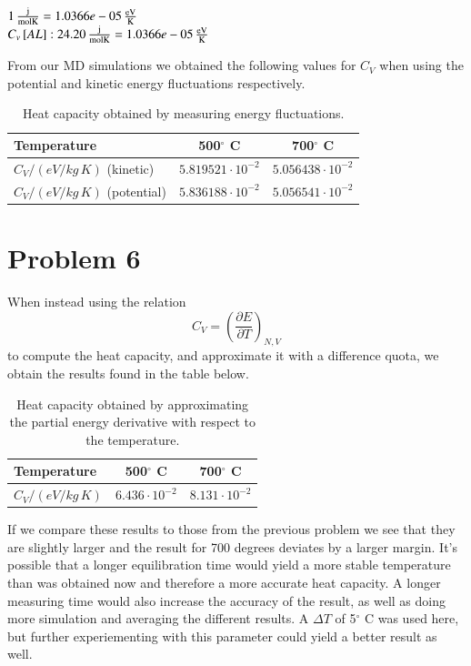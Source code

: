 $\unit[1]{\frac{j}{mol K}}=\unit[1.0366e-05]{\frac{eV}{K}}$ \\
$C_v\left[AL\right]:\unit[24.20]{\frac{j}{mol K}}=\unit[1.0366e-05]{\frac{eV}{K}}$

\noindent From our MD simulations we obtained the following values for $C_V$ when using the potential and kinetic energy fluctuations respectively.
\begin{table}[h!]
	\centering
	\caption{Heat capacity obtained by measuring energy fluctuations.}
	\begin{tabular}{l|cc}
		\hline \textbf{Temperature} & \textbf{500$^\circ$ C} & \textbf{700$^\circ$ C} \\ \hline
		$C_V / (\unit{eV/kg\,K})$ (kinetic) & $5.819521 \cdot 10^{-2}$ & $5.056438 \cdot 10^{-2}$ \\
		$C_V / (\unit{eV/kg\,K})$ (potential) & $5.836188 \cdot 10^{-2}$ & $5.056541 \cdot 10^{-2}$ \\ \hline
	\end{tabular}
	\label{tab:prob5}
\end{table}

\section*{Problem 6}

When instead using the relation
\begin{equation}
	C_V = \left( \frac{\partial E}{\partial T} \right)_{N,V}
\end{equation}
to compute the heat capacity, and approximate it with a difference quota, we obtain the results found in the table below.

\begin{table}[h!]
	\centering	
	\caption{Heat capacity obtained by approximating the partial energy derivative with respect to the temperature.}
	\begin{tabular}{l|cc}
		\hline \textbf{Temperature} & \textbf{500$^\circ$ C} & \textbf{700$^\circ$ C} \\ \hline
		$C_V / (\unit{eV/kg\,K})$ & $6.436 \cdot 10^{-2}$ & $8.131 \cdot 10^{-2}$ \\ \hline
	\end{tabular}
	\label{tab:prob6}
\end{table}

If we compare these results to those from the previous problem we see that they are slightly larger and the result for 700 degrees deviates by a larger margin. It's possible that a longer equilibration time would yield a more stable temperature than was obtained now and therefore a more accurate heat capacity. A longer measuring time would also increase the accuracy of the result, as well as doing more simulation and averaging the different results. A $\Delta T$ of 5$^\circ$ C was used here, but further experiementing with this parameter could yield a better result as well.

